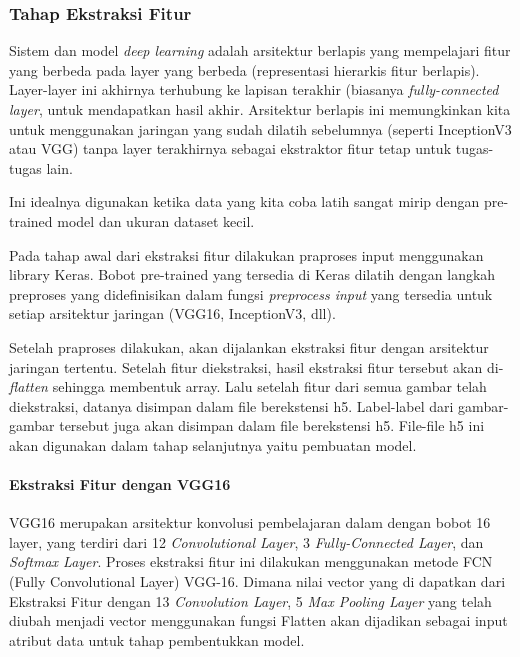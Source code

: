 \subsubsection{Tahap Ekstraksi Fitur}
\par Sistem dan model \textit{deep learning} adalah arsitektur berlapis yang mempelajari fitur yang berbeda pada layer yang berbeda (representasi hierarkis fitur berlapis). Layer-layer ini akhirnya terhubung ke lapisan terakhir (biasanya \textit{fully-connected layer}, untuk mendapatkan hasil akhir. Arsitektur berlapis ini memungkinkan kita untuk menggunakan jaringan yang sudah dilatih sebelumnya (seperti InceptionV3 atau VGG) tanpa layer terakhirnya sebagai ekstraktor fitur tetap untuk tugas-tugas lain.
\par Ini idealnya digunakan ketika data yang kita coba latih sangat mirip dengan pre-trained model dan ukuran dataset kecil.
\par Pada tahap awal dari ekstraksi fitur dilakukan praproses input menggunakan library Keras. Bobot pre-trained yang tersedia di Keras dilatih dengan langkah preproses yang didefinisikan dalam fungsi \textit{preprocess input} yang tersedia untuk setiap arsitektur jaringan (VGG16, InceptionV3, dll).
\par Setelah praproses dilakukan, akan dijalankan ekstraksi fitur dengan arsitektur jaringan tertentu. Setelah fitur diekstraksi, hasil ekstraksi fitur tersebut  akan di-\textit{flatten} sehingga membentuk array. Lalu setelah fitur dari semua gambar telah diekstraksi, datanya disimpan dalam file berekstensi h5. Label-label dari gambar-gambar tersebut juga akan disimpan dalam file berekstensi h5. File-file h5 ini akan digunakan dalam tahap selanjutnya yaitu pembuatan model.

\paragraph{Ekstraksi Fitur dengan VGG16}
\mbox{}
\par VGG16 merupakan arsitektur konvolusi pembelajaran dalam dengan bobot 16 layer, yang terdiri dari 12 \textit{Convolutional Layer}, 3 \textit{Fully-Connected Layer}, dan \textit{Softmax Layer}. Proses ekstraksi fitur ini dilakukan menggunakan metode FCN (Fully Convolutional Layer) VGG-16. Dimana nilai vector yang di dapatkan dari Ekstraksi Fitur dengan 13 \textit{Convolution Layer}, 5 \textit{Max Pooling Layer} yang telah diubah menjadi vector menggunakan fungsi Flatten akan dijadikan sebagai input atribut data untuk tahap pembentukkan model.

